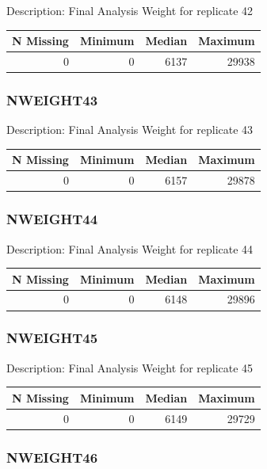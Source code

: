 \documentclass[
]{krantz}
\begin{document}
Description: Final Analysis Weight for replicate 42

\begin{tabular}[t]{r|r|r|r}
\hline
N Missing & Minimum & Median & Maximum\\
\hline
0 & 0 & 6137 & 29938\\
\hline
\end{tabular}

\hypertarget{nweight43}{%
\subsubsection*{NWEIGHT43}\label{nweight43}}


Description: Final Analysis Weight for replicate 43

\begin{tabular}[t]{r|r|r|r}
\hline
N Missing & Minimum & Median & Maximum\\
\hline
0 & 0 & 6157 & 29878\\
\hline
\end{tabular}

\hypertarget{nweight44}{%
\subsubsection*{NWEIGHT44}\label{nweight44}}


Description: Final Analysis Weight for replicate 44

\begin{tabular}[t]{r|r|r|r}
\hline
N Missing & Minimum & Median & Maximum\\
\hline
0 & 0 & 6148 & 29896\\
\hline
\end{tabular}

\hypertarget{nweight45}{%
\subsubsection*{NWEIGHT45}\label{nweight45}}


Description: Final Analysis Weight for replicate 45

\begin{tabular}[t]{r|r|r|r}
\hline
N Missing & Minimum & Median & Maximum\\
\hline
0 & 0 & 6149 & 29729\\
\hline
\end{tabular}

\hypertarget{nweight46}{%
\subsubsection*{NWEIGHT46}\label{nweight46}}
\end{document}
